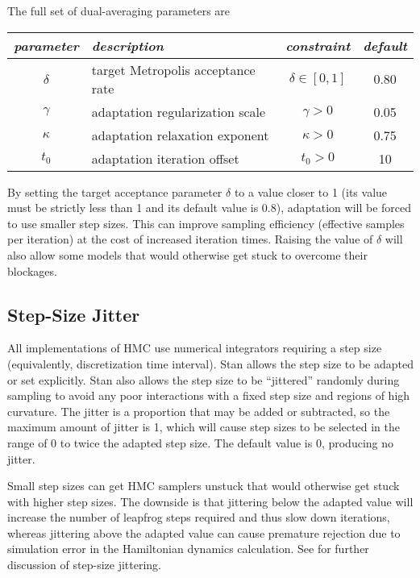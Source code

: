 The full set of dual-averaging parameters are
%
\begin{center}
\begin{tabular}{c|lcc}
{\it parameter} & {\it description} & {\it constraint} & {\it default}
\\ \hline
$\delta$ & target Metropolis acceptance rate
         & $\delta \in [0,1]$
         & 0.80
\\
$\gamma$ & adaptation regularization scale
         & $\gamma > 0$
         & 0.05
\\
$\kappa$ & adaptation relaxation exponent
         & $\kappa > 0$
         & 0.75
\\
$t_0$    & adaptation iteration offset
         & $t_0 > 0$
         & 10
\end{tabular}
\end{center}
%
By setting the target acceptance parameter $\delta$ to a value closer
to 1 (its value must be strictly less than 1 and its default value is
0.8), adaptation will be forced to use smaller step sizes. This can
improve sampling efficiency (effective samples per iteration) at the
cost of increased iteration times. Raising the value of $\delta$ will
also allow some models that would otherwise get stuck to overcome
their blockages.

\subsection{Step-Size Jitter}

All implementations of HMC use numerical integrators requiring a step
size (equivalently, discretization time interval). Stan allows the
step size to be adapted or set explicitly. Stan also allows the step
size to be ``jittered'' randomly during sampling to avoid any poor
interactions with a fixed step size and regions of high curvature. The
jitter is a proportion that may be added or subtracted, so the maximum
amount of jitter is 1, which will cause step sizes to be selected in
the range of 0 to twice the adapted step size. The default value is 0,
producing no jitter.

Small step sizes can get HMC samplers unstuck that would otherwise get
stuck with higher step sizes. The downside is that jittering below the
adapted value will increase the number of leapfrog steps required and
thus slow down iterations, whereas jittering above the adapted value
can cause premature rejection due to simulation error in the
Hamiltonian dynamics calculation. See \citep{Neal:2011} for further
discussion of step-size jittering.


